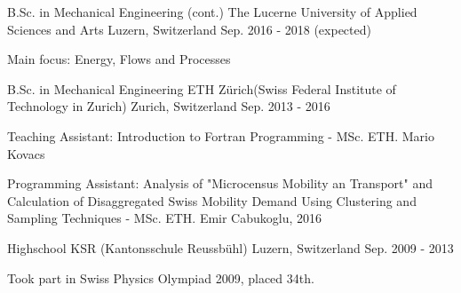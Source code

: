 

\begin{cventries}

\cventry
{B.Sc. in Mechanical Engineering (cont.)} %
{The Lucerne University of Applied Sciences and Arts} %
{Luzern, Switzerland} %
{Sep. 2016 - 2018 (expected)} %
{
	\begin{cvitems} %
		\item {Main focus: Energy, Flows and Processes}
	\end{cvitems}
}


  \cventry
    {B.Sc. in Mechanical Engineering} %
    {ETH Zürich(Swiss Federal Institute of Technology in Zurich)} %
    {Zurich, Switzerland} %
    {Sep. 2013 - 2016} %
    {
      \begin{cvitems} %
        \item {Teaching Assistant: Introduction to Fortran Programming - MSc. ETH. Mario Kovacs}
        \item {Programming Assistant: Analysis of "Microcensus Mobility an Transport" and Calculation of Disaggregated Swiss Mobility Demand Using Clustering and Sampling Techniques - MSc. ETH. Emir Cabukoglu, 2016}
      \end{cvitems}
    }

  \cventry
    {Highschool} %
    {KSR (Kantonsschule Reussbühl)} %
    {Luzern, Switzerland} %
    {Sep. 2009 - 2013} %
    {
      \begin{cvitems} %
        \item {Took part in Swiss Physics Olympiad 2009, placed 34th.}
      \end{cvitems}
    }

\end{cventries}

